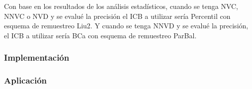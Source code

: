 Con base en los resultados de los análisis estadísticos, cuando se tenga NVC, NNVC o NVD y se evalué la precisión el ICB a utilizar sería Percentil con esquema de remuestreo Liu2. Y cuando se tenga NNVD y se evalué la precisión, el ICB a utilizar sería BCa con esquema de remuestreo ParBal.


\subsubsection{Implementación}

\subsubsection{Aplicación}